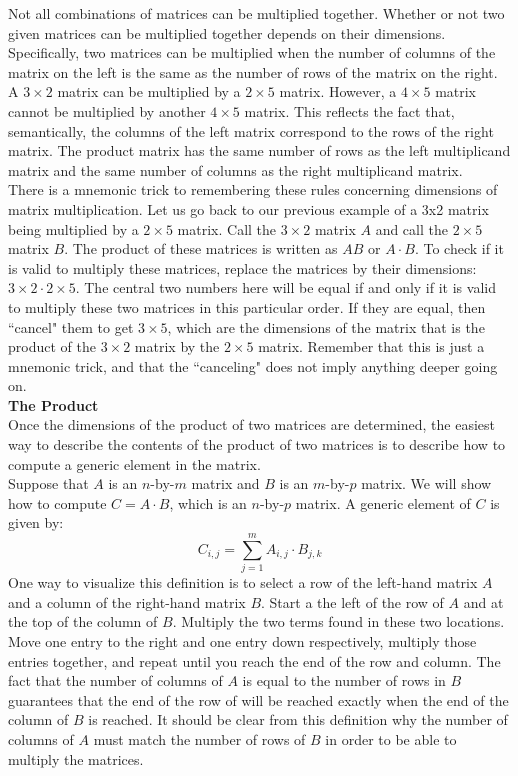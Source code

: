 Not all combinations of matrices can be multiplied together. Whether or not two given matrices can be multiplied together depends on their dimensions. Specifically, two matrices can be multiplied when the number of columns of the matrix on the left is the same as the number of rows of the matrix on the right. A $3\times 2$ matrix can be multiplied by a $2\times 5$ matrix. However, a $4\times 5$ matrix cannot be multiplied by another $4\times 5$ matrix. This reflects the fact that, semantically, the columns of the left matrix correspond to the rows of the right matrix. The product matrix has the same number of rows as the left multiplicand matrix and the same number of columns as the right multiplicand matrix. \\

There is a mnemonic trick to remembering these rules concerning dimensions of matrix multiplication. Let us go back to our previous example of a 3x2 matrix being multiplied by a $2\times 5$ matrix. Call the $3\times 2$ matrix $A$ and call the $2\times 5$ matrix $B$. The product of these matrices is written as $AB$ or $A \cdot B$. To check if it is valid to multiply these matrices, replace the matrices by their dimensions: $3 \times 2 \cdot 2 \times 5$. The central two numbers here will be equal if and only if it is valid to multiply these two matrices in this particular order. If they are equal, then ``cancel" them to get $3 \times 5$, which are the dimensions of the matrix that is the product of the $3 \times 2$ matrix by the $2 \times 5$ matrix. Remember that this is just a mnemonic trick, and that the ``canceling" does not imply anything deeper going on. \\

\textbf{The Product} \\

Once the dimensions of the product of two matrices are determined, the easiest way to describe the contents of the product of two matrices is to describe how to compute a generic element in the matrix. \\

Suppose that $A$ is an $n$-by-$m$ matrix and $B$ is an $m$-by-$p$ matrix. We will show how to compute $C=A \cdot B$, which is an $n$-by-$p$ matrix. A generic element of $C$ is given by:
\[
C_{i,j}=\sum_{j=1}^m A_{i,j} \cdot B_{j,k}
\]
One way to visualize this definition is to select a row of the left-hand matrix $A$ and a column of the right-hand matrix $B$. Start a the left of the row of $A$ and at the top of the column of $B$. Multiply the two terms found in these two locations. Move one entry to the right and one entry down respectively, multiply those entries together, and repeat until you reach the end of the row and column. The fact that the number of columns of $A$ is equal to the number of rows in $B$ guarantees that the end of the row of will be reached exactly when the end of the column of $B$ is reached.	It should be clear from this definition why the number of columns of $A$ must match the number of rows of $B$ in order to be able to multiply the matrices. \\

